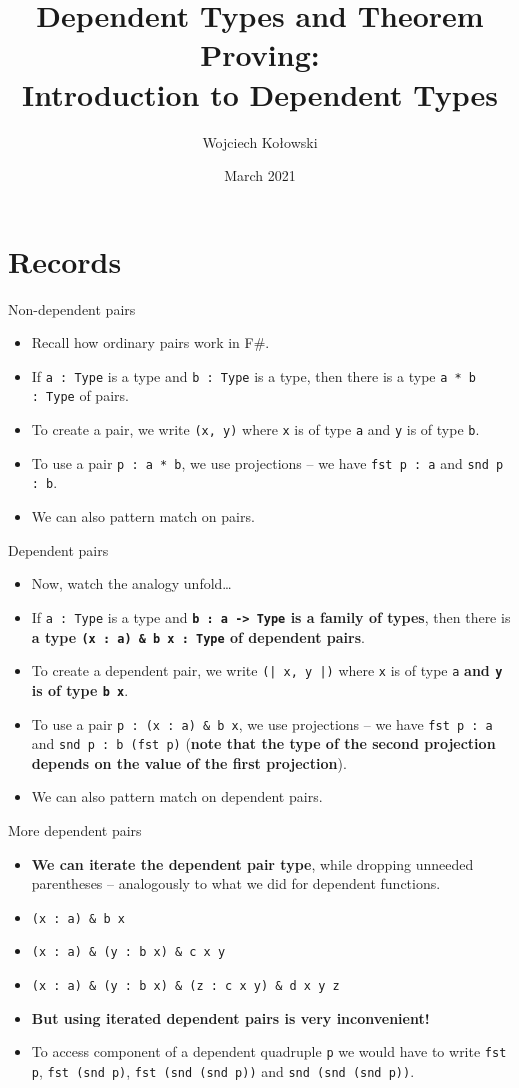 \documentclass{beamer}
\title{Dependent Types and Theorem Proving: \\Introduction to Dependent Types}
\author{Wojciech Kołowski}
\date{March 2021}
\newcommand{\m}[1]{\texttt{#1}}
\begin{document}
\frame{\titlepage}
\frame{\tableofcontents}

\section{Records}

\begin{frame}{Non-dependent pairs}
\begin{itemize}
	\item Recall how ordinary pairs work in F\#.
	\item If \m{a :\ Type} is a type and \m{b :\ Type} is a type, then there is a type \m{a * b :\ Type} of pairs.
	\item To create a pair, we write \m{(x, y)} where \m{x} is of type \m{a} and \m{y} is of type \m{b}.
	\item To use a pair \m{p :\ a * b}, we use projections -- we have \m{fst p :\ a} and \m{snd p :\ b}.
	\item We can also pattern match on pairs.
\end{itemize}
\end{frame}

\begin{frame}{Dependent pairs}
\begin{itemize}
	\item Now, watch the analogy unfold\dots
	\item If \m{a :\ Type} is a type and \textbf{\m{b :\ a -> Type} is a family of types}, then there is \textbf{a type \m{(x :\ a) \& b x :\ Type} of dependent pairs}.
	\item To create a dependent pair, we write \m{(| x, y |)} where \m{x} is of type \m{a} \textbf{and \m{y} is of type \m{b x}}.
	\item To use a pair \m{p :\ (x :\ a) \& b x}, we use projections -- we have \m{fst p :\ a} and \m{snd p :\ b (fst p)} (\textbf{note that the type of the second projection depends on the value of the first projection}).
	\item We can also pattern match on dependent pairs.
\end{itemize}
\end{frame}

\begin{frame}{More dependent pairs}
\begin{itemize}
	\item \textbf{We can iterate the dependent pair type}, while dropping unneeded parentheses -- analogously to what we did for dependent functions.
	\item \m{(x :\ a) \& b x}
	\item \m{(x :\ a) \& (y :\ b x) \& c x y}
	\item \m{(x :\ a) \& (y :\ b x) \& (z :\ c x y) \& d x y z}
	\item \textbf{But using iterated dependent pairs is very inconvenient!}
	\item To access component of a dependent quadruple \m{p} we would have to write \m{fst p}, \m{fst (snd p)}, \m{fst (snd (snd p))} and \m{snd (snd (snd p))}.
\end{itemize}
\end{frame}
\end{document}
